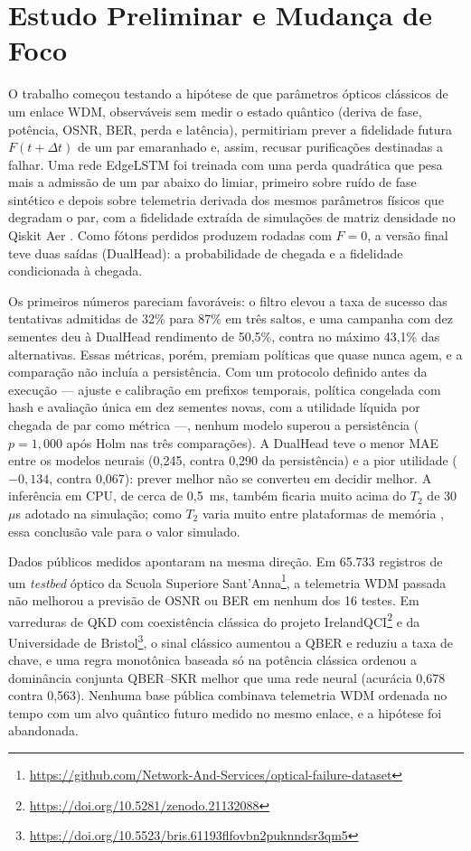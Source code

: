 \documentclass[12pt]{article}
\begin{document}
\section{Estudo Preliminar e Mudança de Foco}
\label{sec:preliminar}

O trabalho começou testando a hipótese de que parâmetros ópticos clássicos de um
enlace WDM, observáveis sem medir o estado quântico (deriva de fase, potência,
OSNR, BER, perda e latência), permitiriam prever a fidelidade futura
$F(t+\Delta t)$ de um par emaranhado e, assim, recusar purificações destinadas a
falhar. Uma rede EdgeLSTM foi treinada com uma perda quadrática que pesa mais a
admissão de um par abaixo do limiar, primeiro sobre ruído de fase sintético
\cite{uhlenbeck1930} e depois sobre telemetria derivada dos mesmos parâmetros
físicos que degradam o par, com a fidelidade extraída de simulações de matriz
densidade no Qiskit Aer \cite{javadi2024}. Como fótons perdidos produzem rodadas
com $F=0$, a versão final teve duas saídas (DualHead): a probabilidade de chegada
e a fidelidade condicionada à chegada.

Os primeiros números pareciam favoráveis: o filtro elevou a taxa de sucesso das
tentativas admitidas de 32\% para 87\% em três saltos, e uma campanha com dez
sementes deu à DualHead rendimento de 50,5\%, contra no máximo 43,1\% das
alternativas. Essas métricas, porém, premiam políticas que quase nunca agem, e a
comparação não incluía a persistência. Com um protocolo definido antes da
execução --- ajuste e calibração em prefixos temporais, política congelada com
hash e avaliação única em dez sementes novas, com a utilidade líquida por
chegada de par como métrica ---, nenhum modelo superou a persistência ($p=1{,}000$
após Holm nas três comparações). A DualHead teve o menor MAE entre os modelos
neurais (0,245, contra 0,290 da persistência) e a pior utilidade ($-0{,}134$,
contra 0,067): prever melhor não se converteu em decidir melhor. A inferência em
CPU, de cerca de 0,5~ms, também ficaria muito acima do $T_2$ de 30~$\mu$s
adotado na simulação; como $T_2$ varia muito entre plataformas de memória
\cite{krutyanskiy2023}, essa conclusão vale para o valor simulado.

Dados públicos medidos apontaram na mesma direção. Em 65.733 registros de um
\textit{testbed} óptico da Scuola Superiore
Sant'Anna\footnote{\url{https://github.com/Network-And-Services/optical-failure-dataset}},
a telemetria WDM passada não melhorou a previsão de OSNR ou BER em nenhum dos 16
testes. Em varreduras de QKD com coexistência clássica do projeto
IrelandQCI\footnote{\url{https://doi.org/10.5281/zenodo.21132088}} e da
Universidade de Bristol\footnote{\url{https://doi.org/10.5523/bris.61193flfovbn2puknndsr3qm5}},
o sinal clássico aumentou a QBER e reduziu a taxa de chave, e uma regra
monotônica baseada só na potência clássica ordenou a dominância conjunta
QBER--SKR melhor que uma rede neural (acurácia 0,678 contra 0,563). Nenhuma base
pública combinava telemetria WDM ordenada no tempo com um alvo quântico futuro
medido no mesmo enlace, e a hipótese foi abandonada.
\end{document}
